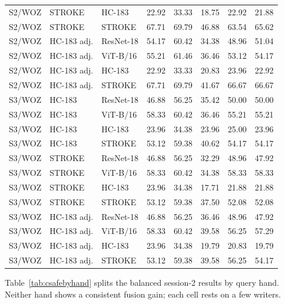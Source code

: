 \documentclass[10pt,a4paper]{article}
\begin{document}
\begin{longtable}{lllrrrrr}
S2/WOZ & STROKE & HC-183 & 22.92 & 33.33 & 18.75 & 22.92 & 21.88 \\
S2/WOZ & STROKE & STROKE & 67.71 & 69.79 & 46.88 & 63.54 & 65.62 \\
S2/WOZ & HC-183 adj. & ResNet-18 & 54.17 & 60.42 & 34.38 & 48.96 & 51.04 \\
S2/WOZ & HC-183 adj. & ViT-B/16 & 55.21 & 61.46 & 36.46 & 53.12 & 54.17 \\
S2/WOZ & HC-183 adj. & HC-183 & 22.92 & 33.33 & 20.83 & 23.96 & 22.92 \\
S2/WOZ & HC-183 adj. & STROKE & 67.71 & 69.79 & 41.67 & 66.67 & 66.67 \\
S3/WOZ & HC-183 & ResNet-18 & 46.88 & 56.25 & 35.42 & 50.00 & 50.00 \\
S3/WOZ & HC-183 & ViT-B/16 & 58.33 & 60.42 & 36.46 & 55.21 & 55.21 \\
S3/WOZ & HC-183 & HC-183 & 23.96 & 34.38 & 23.96 & 25.00 & 23.96 \\
S3/WOZ & HC-183 & STROKE & 53.12 & 59.38 & 40.62 & 54.17 & 54.17 \\
S3/WOZ & STROKE & ResNet-18 & 46.88 & 56.25 & 32.29 & 48.96 & 47.92 \\
S3/WOZ & STROKE & ViT-B/16 & 58.33 & 60.42 & 34.38 & 58.33 & 58.33 \\
S3/WOZ & STROKE & HC-183 & 23.96 & 34.38 & 17.71 & 21.88 & 21.88 \\
S3/WOZ & STROKE & STROKE & 53.12 & 59.38 & 37.50 & 52.08 & 52.08 \\
S3/WOZ & HC-183 adj. & ResNet-18 & 46.88 & 56.25 & 36.46 & 48.96 & 47.92 \\
S3/WOZ & HC-183 adj. & ViT-B/16 & 58.33 & 60.42 & 39.58 & 56.25 & 57.29 \\
S3/WOZ & HC-183 adj. & HC-183 & 23.96 & 34.38 & 19.79 & 20.83 & 19.79 \\
S3/WOZ & HC-183 adj. & STROKE & 53.12 & 59.38 & 39.58 & 56.25 & 54.17 \\
\bottomrule
\end{longtable}

Table~\ref{tab:csafebyhand} splits the balanced session-2 results by query hand. Neither hand shows a consistent fusion gain; each cell rests on a few writers.
\end{document}
